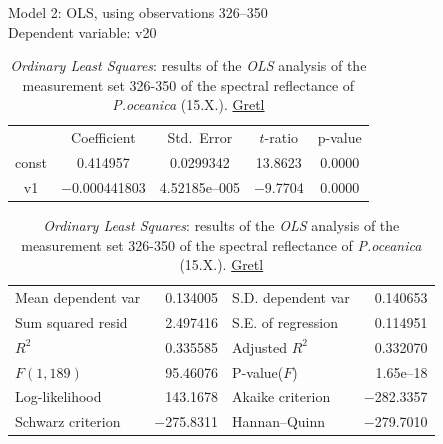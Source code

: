 \documentclass[11pt]{article}
\begin{document}
\begin{appendices}
\begin{table}[H]
	\begin{center}
		\caption{\textit{Ordinary Least Squares}: results of the \textit{OLS} analysis of the measurement set 326-350 of the spectral reflectance of \textit{P.oceanica} (15.X.). \href{http://gretl.sourceforge.net/}{Gretl}}
		Model 2: OLS, using observations 326--350\\
		Dependent variable: v20 \\

		\vspace{1em}
		\begin{tabular}{c c c c c}
		  & {Coefficient} &  {Std.\ Error} &   {$t$-ratio} &    {p-value} \\[1ex]
		const &  0.414957 &    0.0299342 &      13.8623 &        0.0000 \\
		v1 &   $-$0.000441803 &     4.52185\textrm{e--005} &       $-$9.7704 &         0.0000 \\ \hline\hline
	\end{tabular}
	
	\vspace{2em}
	\begin{tabular}{lrlr}
		Mean dependent var &  0.134005 & S.D. dependent var &  0.140653 \\
		Sum squared resid &  2.497416 & S.E. of regression &  0.114951 \\
		$R^2$ &  0.335585 & Adjusted $R^2$ &  0.332070 \\
		$F(1, 189)$ &  95.46076 & P-value($F$) &  1.65\textrm{e--18} \\
		Log-likelihood &  143.1678 & Akaike criterion & $-$282.3357 \\
		Schwarz criterion & $-$275.8311 & Hannan--Quinn & $-$279.7010 \\
	\end{tabular}
	\label{tab:15}
	\end{center}
\end{table}
\pagebreak


\end{appendices}
\end{document}
